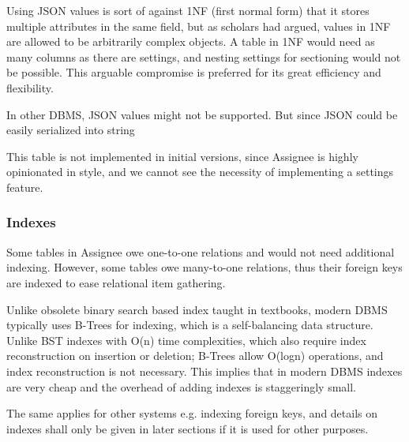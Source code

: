 Using JSON values is sort of against 1NF (first normal form) that it stores multiple
attributes in the same field, but as scholars had argued, values in 1NF are allowed
to be arbitrarily complex objects. A table in 1NF would need as many columns as
there are settings, and nesting settings for sectioning would not be possible.
This arguable compromise is preferred for its great efficiency and flexibility.

\textdagger{} In other DBMS, JSON values might not be supported. But since JSON could
be easily serialized into string

\textdagger{} This table is not implemented in initial versions, since Assignee
is highly opinionated in style, and we cannot see the necessity of implementing a
settings feature.

\subsubsection{Indexes}
\label{data-layer.design.user.indexes}

Some tables in Assignee owe one-to-one relations and would not need additional
indexing. However, some tables owe many-to-one relations, thus their foreign keys
are indexed to ease relational item gathering.

Unlike obsolete binary search based index taught in textbooks, modern DBMS
typically uses B-Trees for indexing, which is a self-balancing data structure.
Unlike BST indexes with O(n) time complexities, which also require index
reconstruction on insertion or deletion; B-Trees allow O(logn) operations, and index
reconstruction is not necessary. This implies that in modern DBMS indexes are
very cheap and the overhead of adding indexes is staggeringly small.

The same applies for other systems e.g. indexing foreign keys, and details on
indexes shall only be given in later sections if it is used for other purposes.